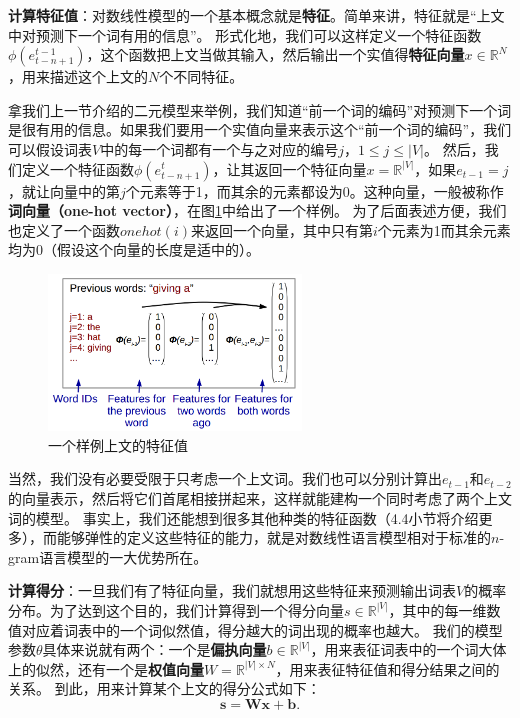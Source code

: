 \documentclass[10pt,a4paper]{ctexart}
\begin{document}
\textbf{计算特征值}：对数线性模型的一个基本概念就是\textbf{特征}。简单来讲，特征就是“上文中对预测下一个词有用的信息”。
形式化地，我们可以这样定义一个特征函数$\phi (e_{t-n+1}^{t-1})$，这个函数把上文当做其输入，然后输出一个实值得\textbf{特征向量$x$}$\in \mathbb{R}^N$，用来描述这个上文的$N$个不同特征。

拿我们上一节介绍的二元模型来举例，我们知道“前一个词的编码”对预测下一个词是很有用的信息。如果我们要用一个实值向量来表示这个“前一个词的编码”，我们可以假设词表$V$中的每一个词都有一个与之对应的编号$j$，$1 \leq j \leq |V|$。
然后，我们定义一个特征函数$\phi (e_{t-n+1}^t)$，让其返回一个特征向量$x = \mathbb{R}^{|V|}$，如果$e_{t-1}=j$，就让向量中的第$j$个元素等于1，而其余的元素都设为0。这种向量，一般被称作\textbf{词向量（one-hot vector）}，在图\ref{fig:4}中给出了一个样例。
为了后面表述方便，我们也定义了一个函数$onehot(i)$来返回一个向量，其中只有第$i$个元素为1而其余元素均为0（假设这个向量的长度是适中的）。

\begin{figure}[H]
\centering
\includegraphics[width=0.6\textwidth]{fig4.png}
\caption{一个样例上文的特征值}
\label{fig:4}
\end{figure}

当然，我们没有必要受限于只考虑一个上文词。我们也可以分别计算出$e_{t-1}$和$e_{t-2}$的向量表示，然后将它们首尾相接拼起来，这样就能建构一个同时考虑了两个上文词的模型。
事实上，我们还能想到很多其他种类的特征函数（4.4小节将介绍更多），而能够弹性的定义这些特征的能力，就是对数线性语言模型相对于标准的$n$-gram语言模型的一大优势所在。

\textbf{计算得分}：一旦我们有了特征向量，我们就想用这些特征来预测输出词表$V$的概率分布。为了达到这个目的，我们计算得到一个得分向量$s \in \mathbb{R}^{|V|}$，其中的每一维数值对应着词表中的一个词似然值，得分越大的词出现的概率也越大。
我们的模型参数$\theta$具体来说就有两个：一个是\textbf{偏执向量}$b \in \mathbb{R}^{|V|}$，用来表征词表中的一个词大体上的似然，还有一个是\textbf{权值向量}$W = \mathbb{R}^{|V| \times N}$，用来表征特征值和得分结果之间的关系。
到此，用来计算某个上文的得分公式如下：
\[
 \textbf{s} = \textbf{Wx} + \textbf{b}.
\]
\end{document}
